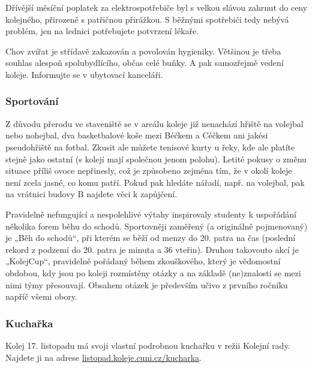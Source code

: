 Dřívější měsíční poplatek za elektrospotřebiče byl s velkou slávou zahrnut do
ceny kolejného, přirozeně s patřičnou přirážkou. S běžnými spotřebiči tedy
nebývá problém, jen na lednici potřebujete potvrzení lékaře.

Chov zvířat je střídavě zakazován a povolován hygieniky. Většinou je třeba
souhlas alespoň spolubydlícího, občas celé buňky. A pak samozřejmě vedení
koleje. Informujte se v ubytovací kanceláři.


\subsubsection{Sportování}
Z důvodu přerodu ve staveniště se v areálu koleje již nenachází hřiště na
volejbal nebo nohejbal, dva basketbalové koše mezi Béčkem a Céčkem ani jakési
pseudohřiště na fotbal. Zkusit ale můžete tenisové kurty u řeky, kde ale platíte
stejně jako ostatní (s kolejí mají společnou jenom polohu). Letité pokusy o
změnu situace příliš ovoce nepřinesly, což je způsobeno zejména tím, že v okolí
koleje není zcela jasné, co komu patří. Pokud pak hledáte nářadí, např. na
volejbal, pak na vrátnici budovy B najdete věci k zapůjčení.

Pravidelně nefungující a nespolehlivé výtahy inspirovaly studenty k uspořádání
několika forem běhu do schodů. Sportovněji zaměřený (a originálně pojmenovaný)
je „Běh do schodů“, při kterém se běží od menzy do 20. patra na čas (poslední
rekord z podzemí do 20. patra je minuta a 36 vteřin). Druhou takovouto akcí je
„KolejCup“, pravidelně pořádaný během zkouškového, který je vědomostní obdobou,
kdy jsou po koleji rozmístěny otázky a na základě (ne)znalosti se mezi nimi týmy
přesouvají. Obsahem otázek je především učivo z prvního ročníku napříč všemi
obory. 

\subsubsection{Kuchařka}
Kolej 17. listopadu má svoji vlastní podrobnou kuchařku v režii Kolejní rady.
Najdete ji na adrese \url{listopad.koleje.cuni.cz/kucharka}.